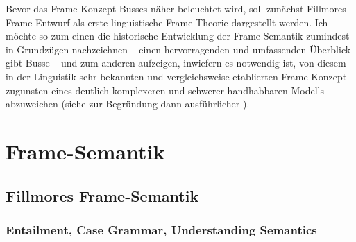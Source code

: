 Bevor das Frame-Konzept Busses näher beleuchtet wird, soll zunächst Fillmores Frame-Entwurf als erste linguistische Frame-Theorie dargestellt werden. Ich möchte so zum einen die historische Entwicklung der Frame-Semantik zumindest in Grundzügen nachzeichnen -- einen hervorragenden und umfassenden Überblick gibt Busse \autocite*{busseFrameSemantikKompendium2012} -- und zum anderen aufzeigen, inwiefern es notwendig ist, von diesem in der Linguistik sehr bekannten und vergleichsweise etablierten Frame-Konzept zugunsten eines deutlich komplexeren und schwerer handhabbaren Modells abzuweichen (siehe zur Begründung dann ausführlicher ).

\section{Frame-Semantik}\label{frame-semantik}

\subsection{Fillmores Frame-Semantik}\label{fillmores-frame-semantik}

\subsubsection{Entailment, Case Grammar, Understanding Semantics}\label{entailment-case-grammar-understanding-semantics}

